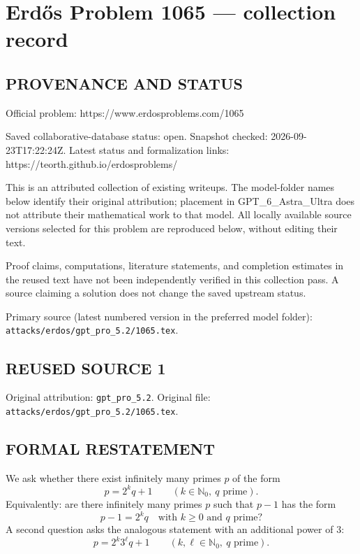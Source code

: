 \section*{Erd\H{o}s Problem 1065 --- collection record}

\subsection*{PROVENANCE AND STATUS}
Official problem: https://www.erdosproblems.com/1065

Saved collaborative-database status: open.
Snapshot checked: 2026-09-23T17:22:24Z.
Latest status and formalization links: https://teorth.github.io/erdosproblems/

This is an attributed collection of existing writeups. The model-folder names below identify their original attribution; placement in GPT\_6\_Astra\_Ultra does not attribute their mathematical work to that model. All locally available source versions selected for this problem are reproduced below, without editing their text.

Proof claims, computations, literature statements, and completion estimates in the reused text have not been independently verified in this collection pass. A source claiming a solution does not change the saved upstream status.

Primary source (latest numbered version in the preferred model folder): \texttt{attacks/erdos/gpt\_pro\_5.2/1065.tex}.

\subsection*{REUSED SOURCE 1}
Original attribution: \texttt{gpt\_pro\_5.2}.
Original file: \texttt{attacks/erdos/gpt\_pro\_5.2/1065.tex}.



\subsection*{FORMAL RESTATEMENT}
We ask whether there exist infinitely many primes $p$ of the form
\[
  p = 2^k q + 1 \qquad (k \in \mathbb{N}_0,\ q \text{ prime}).
\]
Equivalently: are there infinitely many primes $p$ such that $p-1$ has the form
\[
  p-1 = 2^k q \quad\text{with $k\ge 0$ and $q$ prime?}
\]
A second question asks the analogous statement with an additional power of $3$:
\[
  p = 2^k 3^\ell q + 1 \qquad (k,\ell \in \mathbb{N}_0,\ q \text{ prime}).
\]

